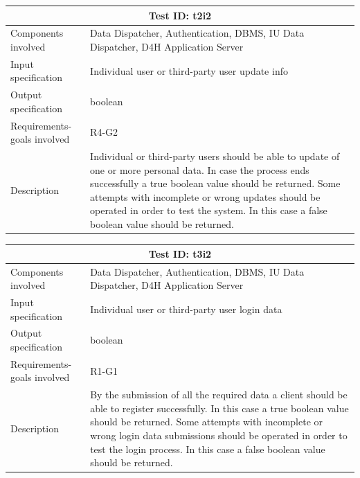 \begin{table}[H]
\centering
\begin{tabular}{ |p{4.5cm}||p{11cm}|  }
 \hline
 \multicolumn{2}{|c|}{Test ID: t2i2} \\
 
 \hline 
 Components involved  	&   Data Dispatcher, Authentication, DBMS, IU Data Dispatcher, D4H Application Server \\
 Input specification  	&  	 Individual user or third-party user update info\\
Output specification  	& 	  boolean	\\
Requirements-goals involved &    R4-G2 \\
Description  	& 	 	    Individual or third-party users should be able to update of one or more personal data. In case the process ends successfully a true boolean value should be returned. Some attempts with incomplete or wrong updates should be operated in order to test the system. In this case a false boolean value should be returned.\\
 \hline
\end{tabular}
\end{table}
\begin{table}[H]
\centering
\begin{tabular}{ |p{4.5cm}||p{11cm}|  }
 \hline
 \multicolumn{2}{|c|}{Test ID: t3i2} \\
 
 \hline 
 Components involved  	&  Data Dispatcher, Authentication, DBMS, IU Data Dispatcher, D4H Application Server \\
 Input specification  	&  	 Individual user or third-party user login data\\
Output specification  	& 	  	boolean\\
Requirements-goals involved &    R1-G1\\
Description  	& 	 	 By the submission of all the required data a client should be able to register successfully. In this case a true boolean value should be returned. Some attempts with incomplete or wrong login data submissions should be operated in order to test the login process. In this case a false boolean value should be returned.   \\
 \hline
\end{tabular}
\end{table}

